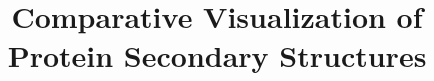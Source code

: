 \documentclass[twocolumn]{bmcart}%
\begin{document}
\begin{frontmatter}

\begin{fmbox}


\title{Comparative Visualization of Protein Secondary Structures}

\author[
     addressref={aff1},
   email={lucia.koc@gmail.com}
]{ }
\author[
   addressref={aff1},                   %
  email={jaresova@mail.muni.cz}   %
]{ }
\author[
   addressref={aff1,aff2},                   %
  email={xbyska@fi.muni.cz}   %
]{ }
\author[
   addressref={aff2},                   %
  email={julius.parulek@uib.no}   %
]{ }
\author[
   addressref={aff2},                   %
  email={Helwig.Hauser@uib.no}   %
]{ }
\author[
   addressref={aff1},                   %
  email={kozlikova@fi.muni.cz}   %
]{ }



\end{fmbox}
\end{frontmatter}
\end{document}
